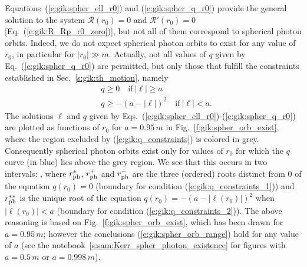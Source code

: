 Equations~(\ref{e:gik:spher_ell_r0}) and (\ref{e:gik:spher_q_r0}) provide
the general solution to the system $\mathcal{R}(r_0) = 0$ and $\mathcal{R}'(r_0) = 0$
[Eq.~(\ref{e:gik:R_Rp_r0_zero})], but not all
of them correspond to spherical photon orbits. Indeed, we do not expect
spherical photon orbits to exist for any value of $r_0$, in particular
for $|r_0|\gg m$. Actually, not all values of $q$ given by Eq.~(\ref{e:gik:spher_q_r0})
are permitted, but only those that fulfill the constraints established in
Sec.~\ref{s:gik:th_motion}, namely
\begin{subequations}
\label{e:gik:q_constraints}
\begin{align}
    & q \geq 0 \quad \mbox{if}\  |\ell| \geq a \label{e:gik:q_constraints_1}\\
    & q \geq - \left( a - |\ell| \right) ^2  \quad \mbox{if}\  |\ell| < a . \label{e:gik:q_constraints_2}
\end{align}
\end{subequations}
The solutions $\ell$ and $q$ given by Eqs.~(\ref{e:gik:spher_ell_r0})-(\ref{e:gik:spher_q_r0})
are plotted as functions of $r_0$ for $a=0.95\, m$
in Fig.~\ref{f:gik:spher_orb_exist}, where the
region excluded by (\ref{e:gik:q_constraints}) is colored in grey. Consequently
spherical photon orbits exist only for values of $r_0$ for which the $q$ curve
(in blue) lies above the grey region. We see that this occurs in two intervals:
\be \label{e:gik:spher_orb_range}
    \qand
    ,
\ee
where $r_{\rm ph}^*$, $r_{\rm ph}^+$ and $r_{\rm ph}^-$ are the three (ordered) roots
distinct from $0$ of the equation $q(r_0) = 0$ (boundary for
condition (\ref{e:gik:q_constraints_1})) and $r_{\rm ph}^{**}$ is the unique
root of the equation $q(r_0) = - \left( a - |\ell(r_0)| \right) ^2$ when
$|\ell(r_0)|  < a$ (boundary for condition (\ref{e:gik:q_constraints_2})).
The above reasoning is based on Fig.~\ref{f:gik:spher_orb_exist}, which has
been drawn for $a=0.95\, m$; however the conclusions (\ref{e:gik:spher_orb_range})
hold for any value of $a$ (see the notebook~\ref{s:sam:Kerr_spher_photon_existence}
for figures with $a=0.5\, m$ or $a=0.998\, m$).

